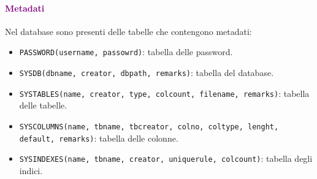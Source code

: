 \paragraph{\textcolor{purple}{Metadati}} Nel database sono presenti
delle tabelle che contengono metadati:
\begin{itemize}
    \item \verb|PASSWORD(username, passowrd)|: tabella delle password.
    \item \verb|SYSDB(dbname, creator, dbpath, remarks)|: tabella del database.
    \item \verb|SYSTABLES(name, creator, type, colcount, filename, remarks)|: tabella delle tabelle.
    \item \verb|SYSCOLUMNS(name, tbname, tbcreator, colno, coltype, lenght, | \\
        \verb|default, remarks)|: tabella delle colonne.
    \item \verb|SYSINDEXES(name, tbname, creator, uniquerule, colcount)|: tabella degli indici.
\end{itemize}